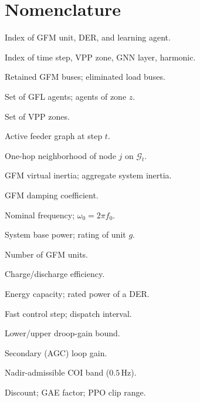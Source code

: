 \documentclass[lettersize,journal]{IEEEtran}
\begin{document}
\section*{Nomenclature}
\begin{IEEEdescription}

\item[\emph{Indices and Sets}]\hfill
\item[$g,\,i,\,m$] Index of GFM unit, DER, and learning agent.
\item[$t,\,z,\,k,\,h$] Index of time step, VPP zone, GNN layer, harmonic.
\item[$I,\,L$] Retained GFM buses; eliminated load buses.
\item[$\mathcal{A},\,\mathcal{A}_z$] Set of GFL agents; agents of zone $z$.
\item[$\mathcal{Z}$] Set of VPP zones.
\item[$\mathcal{G}_t$] Active feeder graph at step $t$.
\item[$\mathcal{N}(j)$] One-hop neighborhood of node $j$ on $\mathcal{G}_t$.

\item[\emph{Parameters and Constants}]\hfill
\item[$H_g,\,H_{\mathrm{sys}}$] GFM virtual inertia; aggregate system inertia.
\item[$D_g$] GFM damping coefficient.
\item[$f_0,\,\omega_0$] Nominal frequency; $\omega_0=2\pi f_0$.
\item[$S_{\mathrm{base}},\,S_g$] System base power; rating of unit $g$.
\item[$n_g$] Number of GFM units.
\item[$\eta_{\mathrm{ch}},\eta_{\mathrm{dis}}$] Charge/discharge efficiency.
\item[$E,\,P_{\mathrm{rated}}$] Energy capacity; rated power of a DER.
\item[$\Delta t,\,\Delta T$] Fast control step; dispatch interval.
\item[$K_{\min},K_{\max}$] Lower/upper droop-gain bound.
\item[$k_{\mathrm{agc}}$] Secondary (AGC) loop gain.
\item[$\delta$] Nadir-admissible COI band ($0.5$\,Hz).
\item[$\gamma,\,\lambda,\,\epsilon$] Discount; GAE factor; PPO clip range.


\end{IEEEdescription}
\end{document}
